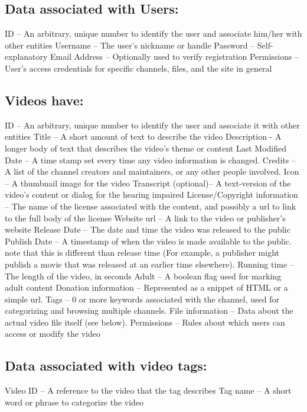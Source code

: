 \documentclass[a4paper,12pt]{report}
\begin{document}
\subsection{Data associated with Users:}
ID – An arbitrary, unique number to identify the user and associate him/her with other entities
Username – The user's nickname or handle
Password – Self-explanatory
Email Address – Optionally used to verify registration
Permissions – User's access credentials for specific channels, files, and the site in general

\subsection{Videos have:}
ID – An arbitrary, unique number to identify the user and associate it with other entities 
Title – A short amount of text to describe the video
Description - A longer body of text that describes the video's theme or content
Last Modified Date – A time stamp set every time any video information is changed.
Credits – A list of the channel creators and maintainers, or any other people involved. 
Icon – A thumbnail image for the video
Transcript (optional)– A text-version of the video's content or dialog for the hearing impaired
License/Copyright information – The name of the license associated with the content, and possibly a url to link to the full body of the license
Website url – A link to the video  or publisher's website
Release Date – The date and time the video was released to the public
Publish Date – A timestamp of when the video is made available to the public. note that this is different than release time (For example, a publisher might publish a movie that was released at an earlier time elsewhere).
Running time – The length of the video, in seconds
Adult – A boolean flag used for marking adult content
Donation information – Represented as a snippet of HTML or a simple url.
Tags – 0 or more keywords associated with the channel, used for categorizing and 	browsing multiple channels.
File information – Data about the actual video file itself (see below).
Permissions – Rules about which users can access or modify the video

\subsection{Data associated with video tags:}
	Video ID – A reference to the video that the tag describes
	Tag name – A short word or phrase to categorize the video
\end{document}
